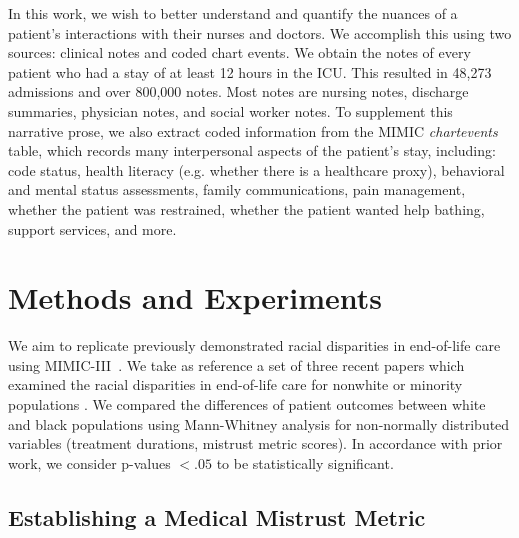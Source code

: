 \documentclass{article}
\begin{document}
In this work, we wish to better understand and quantify the nuances of a patient's interactions with their nurses and doctors. We accomplish this using two sources: clinical notes and coded chart events. We obtain the notes of every patient who had a stay of at least 12 hours in the ICU. This resulted in 48,273 admissions and over 800,000 notes. Most notes are nursing notes, discharge summaries, physician notes, and social worker notes. To supplement this narrative prose, we also extract coded information from the MIMIC \textit{chartevents} table, which records many interpersonal aspects of the patient's stay, including: code status, health literacy (e.g. whether there is a healthcare proxy), behavioral and mental status assessments, family communications, pain management, whether the patient was restrained, whether the patient wanted help bathing, support services, and more.



\section{Methods and Experiments}




We aim to replicate previously demonstrated racial disparities in end-of-life care using MIMIC-III~\citep{johnson2016mimiciii}. We take as reference a set of three recent papers which examined the racial disparities in end-of-life care for nonwhite or minority populations \citep{ices:immigration,muni:race-ses-eol-icu,lee:dying-icu}. We compared the differences of patient outcomes between white and black populations using Mann-Whitney analysis for non-normally distributed variables (treatment durations, mistrust metric scores). In accordance with prior work, we consider p-values $<.05$ to be statistically significant.



\subsection{Establishing a Medical Mistrust Metric}\label{mistrust-methods}
 
\end{document}
